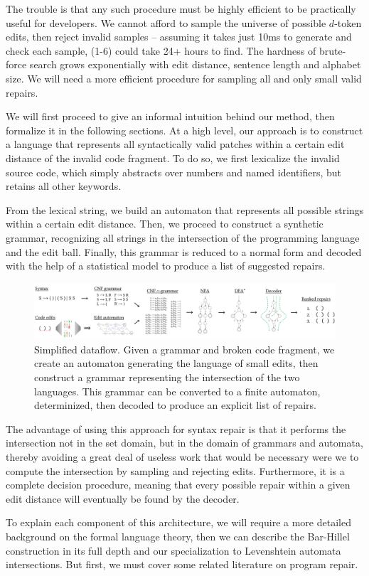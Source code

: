 The trouble is that any such procedure must be highly efficient to be practically useful for developers. We cannot afford to sample the universe of possible $d$-token edits, then reject invalid samples -- assuming it takes just 10ms to generate and check each sample, (1-6) could take 24+ hours to find. The hardness of brute-force search grows exponentially with edit distance, sentence length and alphabet size. We will need a more efficient procedure for sampling all and only small valid repairs.

We will first proceed to give an informal intuition behind our method, then formalize it in the following sections. At a high level, our approach is to construct a language that represents all syntactically valid patches within a certain edit distance of the invalid code fragment. To do so, we first lexicalize the invalid source code, which simply abstracts over numbers and named identifiers, but retains all other keywords.

From the lexical string, we build an automaton that represents all possible strings within a certain edit distance. Then, we proceed to construct a synthetic grammar, recognizing all strings in the intersection of the programming language and the edit ball. Finally, this grammar is reduced to a normal form and decoded with the help of a statistical model to produce a list of suggested repairs.

\begin{figure}[h!]
  \includegraphics[width=\textwidth]{content/figures/flow.pdf}\vspace{-1pt}
  \caption{Simplified dataflow. Given a grammar and broken code fragment, we create an automaton generating the language of small edits, then construct a grammar representing the intersection of the two languages. This grammar can be converted to a finite automaton, determinized, then decoded to produce an explicit list of repairs.}\label{fig:arch_simp}
\end{figure}

The advantage of using this approach for syntax repair is that it performs the intersection not in the set domain, but in the domain of grammars and automata, thereby avoiding a great deal of useless work that would be necessary were we to compute the intersection by sampling and rejecting edits. Furthermore, it is a complete decision procedure, meaning that every possible repair within a given edit distance will eventually be found by the decoder.

To explain each component of this architecture, we will require a more detailed background on the formal language theory, then we can describe the Bar-Hillel construction in its full depth and our specialization to Levenshtein automata intersections. But first, we must cover some related literature on program repair.

\clearpage